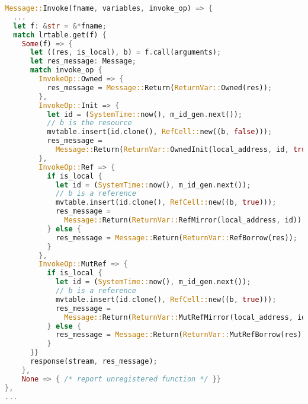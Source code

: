 \begin{lstlisting}[language=Rust, style=boxed, basicstyle=\footnotesize\ttfamily, caption={Executing an invocation and returning the result}, label=impl:exec-return]
Message::Invoke(fname, variables, invoke_op) => {
  ...
  let f: &str = &*fname; 
  match lrtable.get(f) {
    Some(f) => {
      let ((res, is_local), b) = f.call(arguments);
      let res_message: Message;
      match invoke_op {
        InvokeOp::Owned => { 
          res_message = Message::Return(ReturnVar::Owned(res)); 
        },
        InvokeOp::Init => {
          let id = (SystemTime::now(), m_id_gen.next());
          // b is the resource
          mvtable.insert(id.clone(), RefCell::new((b, false)));
          res_message = 
            Message::Return(ReturnVar::OwnedInit(local_address, id, true));
        },
        InvokeOp::Ref => {
          if is_local {
            let id = (SystemTime::now(), m_id_gen.next());
            // b is a reference
            mvtable.insert(id.clone(), RefCell::new((b, true)));
            res_message =
              Message::Return(ReturnVar::RefMirror(local_address, id));
          } else { 
            res_message = Message::Return(ReturnVar::RefBorrow(res)); 
          }
        },
        InvokeOp::MutRef => {
          if is_local {
            let id = (SystemTime::now(), m_id_gen.next());
            // b is a reference
            mvtable.insert(id.clone(), RefCell::new((b, true)));
            res_message =
              Message::Return(ReturnVar::MutRefMirror(local_address, id));
          } else { 
            res_message = Message::Return(ReturnVar::MutRefBorrow(res)); 
          }
      }}
      response(stream, res_message);
    },
    None => { /* report unregistered function */ }}
},
...
\end{lstlisting}

